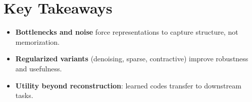 
\section*{Key Takeaways}

\begin{itemize}[leftmargin=2em]
    \item \textbf{Bottlenecks and noise} force representations to capture structure, not memorization.
    \item \textbf{Regularized variants} (denoising, sparse, contractive) improve robustness and usefulness.
    \item \textbf{Utility beyond reconstruction}: learned codes transfer to downstream tasks.
\end{itemize}


